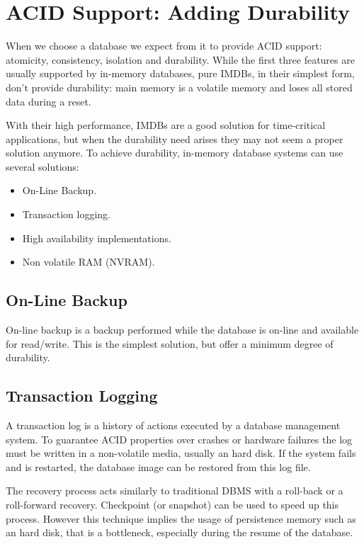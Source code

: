 	\section{ACID Support: Adding Durability} \label{durability}
		When we choose a database we expect from it to provide ACID support: atomicity, consistency, 
		isolation and durability. While the first three features are usually supported by in-memory 
		databases, pure IMDBs, in their simplest form, don't provide durability: 
		main memory is a volatile memory and loses all stored data during a reset. 
		
		With their high performance, IMDBs are a good solution for time-critical 
		applications, but when the durability need arises they may not seem a proper
		solution anymore.	To achieve durability\cite{Gorine}, 
		in-memory database systems can use several solutions:
		
		\begin{itemize}			
			\item On-Line Backup. 
			\item Transaction logging.
			\item High availability implementations.	
			\item Non volatile RAM (NVRAM).
		\end{itemize}	
		
		\subsection{On-Line Backup}
			On-line backup is a backup performed while the database is on-line 
			and available for read/write. This is the simplest solution,
			but offer a minimum degree of durability.
		
		\subsection{Transaction Logging}
			A transaction log is a history of actions executed by a database 
			management system. To guarantee ACID properties over crashes or hardware 
			failures the log must be written in a non-volatile media, usually an hard disk. 
			If the system fails and is restarted, the database image can be restored from 
			this log file. 
			
			The recovery process acts similarly to traditional DBMS with a roll-back 
			or a roll-forward recovery. Checkpoint (or snapshot) can be 
			used to speed up this process. However this technique implies the usage 
			of persistence memory such as an hard disk, that is a bottleneck, 
			especially during the resume of the database.
			
